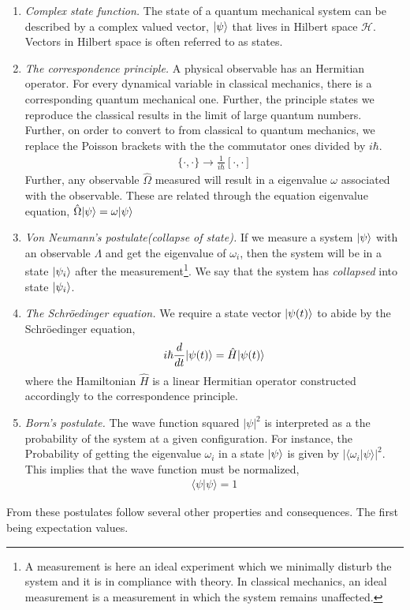 \begin{enumerate}[I]
	\item \textit{Complex state function.} The state of a quantum mechanical system can be described by a complex valued vector, $|{\psi}\rangle$ that lives in Hilbert space $\mathcal{H}$. Vectors in Hilbert space is often referred to as states.
	\item \textit{The correspondence principle.} A physical observable has an Hermitian operator. For every dynamical variable in classical mechanics, there is a corresponding quantum mechanical one. Further, the principle states we reproduce the classical results in the limit of large quantum numbers. Further, on order to convert to from classical to quantum mechanics, we replace the Poisson brackets with the the commutator ones divided by $i\hbar$.
	\begin{align}
		\{\cdot,\cdot\} \rightarrow \frac{1}{i\hbar}[\cdot,\cdot]
		\label{eq:poisson}
	\end{align}
	Further, any observable $\hat{\Omega}$ measured will result in a eigenvalue $\omega$ associated with the observable. These are related through the equation eigenvalue equation, $\hat{\Omega}|{\psi}\rangle=\omega|{\psi}\rangle$
	\item \textit{Von Neumann's postulate(collapse of state).} If we measure a system $|{\psi}\rangle$ with an observable $\Lambda$ and get the eigenvalue of $\omega_i$, then the system will be in a state $|{\psi_i}\rangle$ after the measurement\footnote{A measurement is here an ideal experiment which we minimally disturb the system and it is in compliance with theory. In classical mechanics, an ideal measurement is a measurement in which the system remains unaffected.}. We say that the system has \textit{collapsed} into state $|{\psi_i}\rangle$.
	\item \textit{The Schröedinger equation.} We require a state vector $|{\psi(t)}\rangle$ to abide by the Schröedinger equation,
	\begin{align}
		i\hbar\frac{d}{dt}|{\psi(t)}\rangle = \hat{H} |{\psi(t)}\rangle
		\label{eq:schroedinger}
	\end{align}
	where the Hamiltonian $\hat{H}$ is a linear Hermitian operator constructed accordingly to the correspondence principle.
	\item \textit{Born's postulate.} The wave function squared $|\psi|^2$ is interpreted as a the probability of the system at a given configuration. For instance, the Probability of getting the eigenvalue $\omega_i$ in a state $|{\psi}\rangle$ is given by $|\langle\omega_i|\psi\rangle|^2$. This implies that the wave function must be normalized,
	\begin{align}
		\langle \psi | \psi \rangle = 1
		\label{eq:wf-normalized}
	\end{align}
\end{enumerate}
From these postulates follow several other properties and consequences. The first being expectation values.

